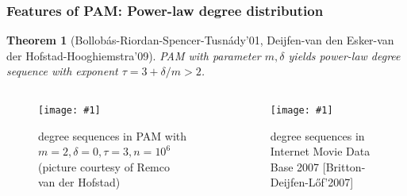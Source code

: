 \documentclass{beamer}
\theoremstyle{plain}
\newtheorem{thm}{Theorem}
\theoremstyle{definition}
\newcommand{\post}[2]{\begin{center} \texttt{[image: \#1]} \end{center} }
\begin{document}
\begin{frame}
\frametitle{Features of PAM: Power-law degree distribution}
\begin{thm}[Bollob\'as-Riordan-Spencer-Tusn\'ady'01, Deijfen-van den Esker-van der Hofstad-Hooghiemstra'09]
    PAM with parameter $m,\delta$ yields power-law degree sequence with exponent $\tau=3+\delta/m>2$.
\end{thm}
\pause
\begin{columns}
    \begin{column}{0.5\textwidth}
        \begin{figure}
        \begin{centering}
        \post{Degree_Distribution.jpeg}{2in}
        \caption{degree sequences in PAM with $m=2,\delta=0,\tau=3,n=10^6$ (picture courtesy of Remco van der Hofstad)}
        \end{centering}
        \end{figure}
    \end{column}
    \begin{column}{0.5\textwidth}
        \begin{figure}
        \begin{centering}
        \post{Degree_Real_Network.jpeg}{1.5in}
        \caption{degree sequences in Internet Movie Data Base 2007 {\color{red}[Britton-Deijfen-L\H{o}f'2007]} }
        \end{centering}
        \end{figure}
    \end{column}
\end{columns}
\end{frame}
\end{document}
